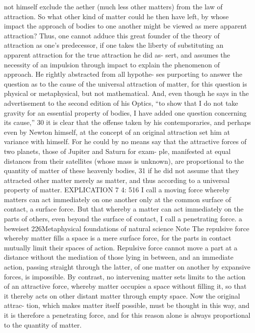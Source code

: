 not himself exclude the aether (much less other matters) from the law
of attraction. So what other kind of matter could he then have left, by
whose impact the approach of bodies to one another might be viewed as
mere apparent attraction? Thus, one cannot adduce this great founder
of the theory of attraction as one’s predecessor, if one takes the liberty
of substituting an apparent attraction for the true attraction he did as-
sert, and assumes the necessity of an impulsion through impact to explain
the phenomenon of approach. He rightly abstracted from all hypothe-
ses purporting to answer the question as to the cause of the universal
attraction of matter, for this question is physical or metaphysical, but
not mathematical. And, even though he says in the advertisement to the
second edition of his Optics, “to show that I do not take gravity for an
essential property of bodies, I have added one question concerning its
cause,” 30 it is clear that the offense taken by his contemporaries, and
perhaps even by Newton himself, at the concept of an original attraction
set him at variance with himself. For he could by no means say that the
attractive forces of two planets, those of Jupiter and Saturn for exam-
ple, manifested at equal distances from their satellites (whose mass is
unknown), are proportional to the quantity of matter of these heavenly
bodies, 31 if he did not assume that they attracted other matter merely as
matter, and thus according to a universal property of matter.
EXPLICATION 7
4: 516
I call a moving force whereby matters can act immediately on one another
only at the common surface of contact, a surface force. But that whereby
a matter can act immediately on the parts of others, even beyond the
surface of contact, I call a penetrating force.
a
beweiset
226Metaphysical foundations of natural science
Note
The repulsive force whereby matter ﬁlls a space is a mere surface force,
for the parts in contact mutually limit their spaces of action. Repulsive
force cannot move a part at a distance without the mediation of those
lying in between, and an immediate action, passing straight through the
latter, of one matter on another by expansive forces, is impossible. By
contrast, no intervening matter sets limits to the action of an attractive
force, whereby matter occupies a space without ﬁlling it, so that it thereby
acts on other distant matter through empty space. Now the original attrac-
tion, which makes matter itself possible, must be thought in this way,
and it is therefore a penetrating force, and for this reason alone is always
proportional to the quantity of matter.
